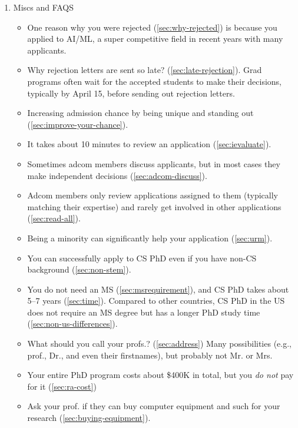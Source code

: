 \documentclass[oneside,11pt,dvipsnames]{book}
\begin{document}
\begin{enumerate}
    \item Miscs and FAQS
        \begin{itemize}
          \item One reason why you were rejected (\autoref{sec:why-rejected}) is because you applied to AI/ML, a super competitive field in recent years with many applicants.
          
          \item Why rejection letters are sent so late? (\autoref{sec:late-rejection}). Grad programs often wait for the accepted students to make their decisions, typically by April 15, before sending out rejection letters.
          
          \item Increasing admission chance by being unique and standing out (\autoref{sec:improve-your-chance}).
          \item It takes about 10 minutes to review an application (\autoref{sec:ievaluate}).
          \item Sometimes adcom members discuss applicants, but in most cases they make independent decisions (\autoref{sec:adcom-discuss}).           
          \item Adcom members only review applications assigned to them (typically matching their expertise) and rarely get involved in other applications (\autoref{sec:read-all}).
        
          \item Being a minority can significantly help your application (\autoref{sec:urm}).
          \item You can successfully apply to CS PhD even if you have non-CS background (\autoref{sec:non-stem}).
          \item You do not need an MS (\autoref{sec:msrequirement}), and CS PhD takes about 5--7 years (\autoref{sec:time}). Compared to other countries, CS PhD in the US does not require an MS degree but has a longer PhD study time (\autoref{sec:non-us-differences}).
          \item What should you call your profs.? (\autoref{sec:address}) Many possibilities (e.g., prof., Dr., and even their firstnames), but probably not Mr. or Mrs.
          \item Your entire PhD program costs about \$400K in total, but you \emph{do not} pay for it (\autoref{sec:ra-cost})
          \item Ask your prof. if they can buy computer equipment and such for your research (\autoref{sec:buying-equipment}).
        \end{itemize}



\end{enumerate}
\end{document}
